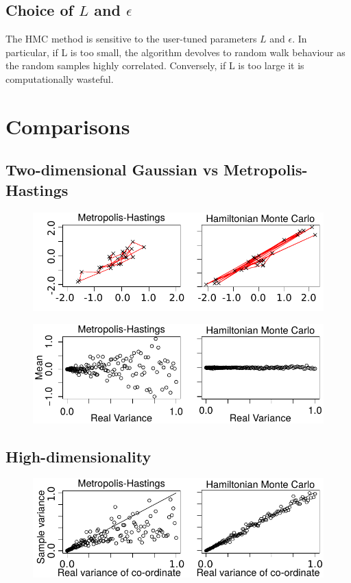 \documentclass[11pt]{article}
\begin{document}
\subsection{Choice of $L$ and $\epsilon$}
The HMC method is sensitive to the user-tuned parameters $L$ and $\epsilon$. In particular, if L is too small, the algorithm devolves to random walk behaviour as the random samples highly correlated. Conversely, if L is too large it is computationally wasteful.
\section{Comparisons}
\subsection{Two-dimensional Gaussian vs Metropolis-Hastings}
\begin{figure}[H]
  \includegraphics[width=1\linewidth]{images/MHvsHM_explore.pdf}
\end{figure}
\begin{figure}[H]
  \includegraphics[width=1\linewidth]{images/MHvsHM_var.pdf}
\end{figure}
\subsection{High-dimensionality}
\begin{figure}[H]
  \includegraphics[width=1\linewidth]{images/MHvsHM_varcoord.pdf}
\end{figure}
\end{document}
